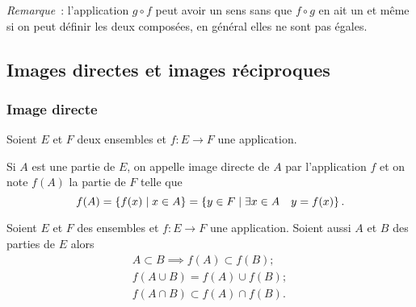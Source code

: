 \emph{Remarque}~: l'application \(g \circ f\) peut avoir un sens sans que \(f \circ g\) en ait un et même si on peut définir les deux composées, en général elles ne sont pas égales.
%
\subsection{Images directes et images réciproques}
\label{chap3-subsec:imagesdirecteetrec}
\subsubsection{Image directe}
\label{chap3-subsec:imagedirecte}
Soient \(E\) et \(F\) deux ensembles et \(f: E \longrightarrow F\) une application.
\begin{defdef}
  Si \(A\) est une partie de \(E\), on appelle image directe de \(A\) par l'application \(f\) et on note \(f(A)\) la partie de \(F\) telle que
  \begin{equation}
    f(A)=\left\{f(x)\mathrel{}\middle|\mathrel{}x \in A\right\}=\left\{y \in F\mathrel{}\middle|\mathrel{}\exists x \in A \quad y=f(x)\right\}.
  \end{equation}
\end{defdef}
%
\begin{prop}
  Soient \(E\) et \(F\) des ensembles et \(f:E \longrightarrow F\) une application. Soient aussi \(A\) et \(B\) des parties de \(E\) alors
  \begin{gather}
    A \subset B \implies f(A) \subset f(B); \\
    f(A \cup B)=f(A) \cup f(B); \\
    f(A \cap B) \subset f(A) \cap f(B).
  \end{gather}
\end{prop}
